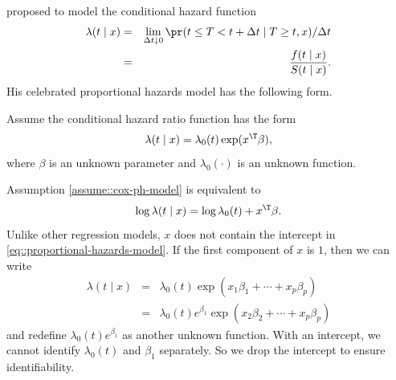 \citet{cox1972regression} proposed to model the conditional hazard function
\begin{eqnarray*}
\lambda(t\mid x) 
&=& \lim_{\Delta t\downarrow0}\pr(t\leq T<t+\Delta t\mid T\geq t,x)/\Delta t \\
&=&\frac{f(t\mid x)}{S(t\mid x)} .
\end{eqnarray*}
His celebrated proportional hazards model has the following form.

\begin{assumption}
\label{assume::cox-ph-model}
Assume the conditional hazard ratio function has the form
\begin{eqnarray}\label{eq::proportional-hazards-model}
\lambda(t\mid x)=\lambda_{0}(t)\exp(x^{\T}\beta) ,
\end{eqnarray}
where $\beta$ is an unknown parameter and $\lambda_{0}(\cdot)$ is an unknown function. 
\end{assumption}

Assumption \ref{assume::cox-ph-model} is equivalent to
$$
\log \lambda(t\mid x) = \log \lambda_{0}(t) + x^{\T}\beta .
$$
Unlike other regression models, $x$ does not contain the intercept in \eqref{eq::proportional-hazards-model}. If the first component of $x$ is $1$, then we can write 
\begin{eqnarray*}
\lambda(t\mid x) 
&=&\lambda_{0}(t)  \exp(x_1\beta_1 + \cdots + x_p \beta_p) \\
&=& \lambda_{0}(t) e^{\beta_1}  \exp(x_2\beta_2 + \cdots + x_p \beta_p)
\end{eqnarray*}
and redefine $\lambda_{0}(t) e^{\beta_1}$ as another unknown function. With an intercept, we cannot identify $\lambda_{0}(t) $ and $\beta_1$ separately.  So we drop the intercept to ensure identifiability. 

